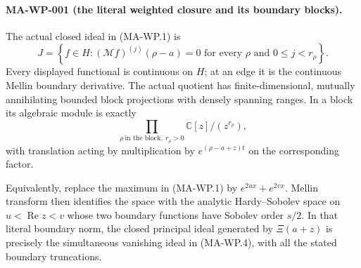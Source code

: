 \paragraph{MA-WP-001 (the literal weighted closure and its boundary blocks).}
The actual closed ideal in (MA-WP.1) is
\[
 J=\left\{f\in H:
    (\mathcal Mf)^{(j)}(\rho-a)=0
       \text{ for every }\rho\text{ and }0\le j<r_\rho\right\}.
 \tag{MA-WP.4}
\]
Every displayed functional is continuous on $H$; at an edge it
is the continuous Mellin boundary derivative. The actual quotient
has finite-dimensional, mutually annihilating bounded block
projections with densely spanning ranges. In a block its algebraic
module is exactly
\[
             \prod_{\rho\ \text{in the block},\ r_\rho>0}
                         \mathbb C[z]/(z^{r_\rho}),
 \tag{MA-WP.5}
\]
with translation acting by multiplication by
$e^{(\rho-a+z)t}$ on the corresponding factor.

Equivalently, replace the maximum in (MA-WP.1) by
$e^{2ux}+e^{2vx}$. Mellin transform then identifies the space
with the analytic Hardy--Sobolev space on $u<\operatorname{Re}z<v$
whose two boundary functions have Sobolev order $s/2$.
In that literal boundary norm, the closed principal ideal generated
by $\Xi(a+z)$ is precisely the simultaneous vanishing ideal in
(MA-WP.4), with all the stated boundary truncations.


